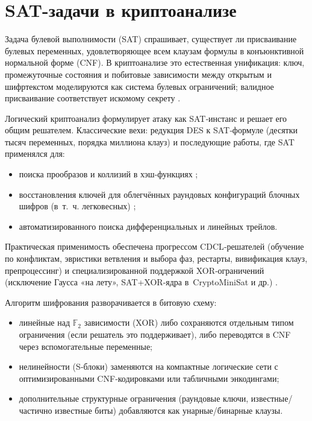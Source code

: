
\section{SAT-задачи в криптоанализе}

\label{sec:sat-crypto}

Задача булевой выполнимости (SAT) спрашивает, существует ли присваивание булевых переменных, удовлетворяющее всем клаузам формулы в конъюнктивной нормальной форме (CNF). В криптоанализе это естественная унификация: ключ, промежуточные состояния и побитовые зависимости между открытым и шифртекстом моделируются как система булевых ограничений; валидное присваивание соответствует искомому секрету \cite{Zhang2000}.

Логический криптоанализ формулирует атаку как SAT‑инстанс и решает его общим решателем. Классические вехи: редукция DES к SAT‑формуле (десятки тысяч переменных, порядка миллиона клауз) \cite{Zhang2000} и последующие работы, где SAT применялся для:
\begin{itemize}
  \item поиска прообразов и коллизий в хэш‑функциях \cite{Mironov2006};
  \item восстановления ключей для облегчённых раундовых конфигураций блочных шифров (в~т.~ч. легковесных) \cite{Lafitte2014};
  \item автоматизированного поиска дифференциальных и линейных трейлов.
\end{itemize}

Практическая применимость обеспечена прогрессом CDCL‑решателей (обучение по конфликтам, эвристики ветвления и выбора фаз, рестарты, вивификация клауз, препроцессинг) и специализированной поддержкой XOR‑ограничений (исключение Гаусса «на лету», SAT+XOR‑ядра в~CryptoMiniSat и др.) \cite{Im2025}.

Алгоритм шифрования разворачивается в битовую схему:
\begin{itemize}
  \item линейные над \(\mathbb{F}_2\) зависимости (XOR) либо сохраняются отдельным типом ограничения (если решатель это поддерживает), либо переводятся в CNF через вспомогательные переменные;
  \item нелинейности (S‑блоки) заменяются на компактные логические сети с оптимизированными CNF‑кодировками или табличными энкодингами;
  \item дополнительные структурные ограничения (раундовые ключи, известные/частично известные биты) добавляются как унарные/бинарные клаузы.
\end{itemize}

